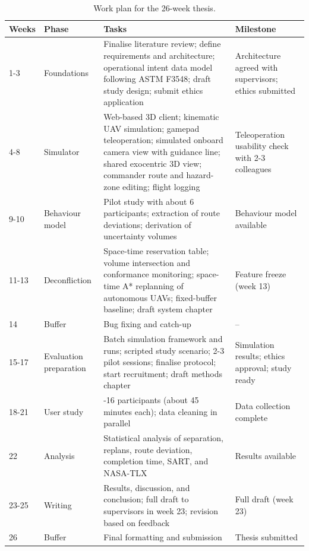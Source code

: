 \documentclass{article}
\begin{document}
\begin{table}[h]
\centering
\small
\renewcommand{\arraystretch}{1.3}
\begin{tabularx}{\textwidth}{@{}l>{\raggedright\arraybackslash}p{2.3cm}>{\raggedright\arraybackslash}X>{\raggedright\arraybackslash}p{3.2cm}@{}}
\toprule
\textbf{Weeks} & \textbf{Phase} & \textbf{Tasks} & \textbf{Milestone} \\
\midrule
1-3 & Foundations & Finalise literature review; define requirements and architecture; operational intent data model following ASTM F3548; draft study design; submit ethics application & Architecture agreed with supervisors; ethics submitted \\
4-8 & Simulator & Web-based 3D client; kinematic UAV simulation; gamepad teleoperation; simulated onboard camera view with guidance line; shared exocentric 3D view; commander route and hazard-zone editing; flight logging & Teleoperation usability check with 2-3 colleagues \\
9-10 & Behaviour model & Pilot study with about 6 participants; extraction of route deviations; derivation of uncertainty volumes & Behaviour model available \\
11-13 & Deconfliction & Space-time reservation table; volume intersection and conformance monitoring; space-time A* replanning of autonomous UAVs; fixed-buffer baseline; draft system chapter & Feature freeze (week 13) \\
14 & Buffer & Bug fixing and catch-up & -- \\
15-17 & Evaluation preparation & Batch simulation framework and runs; scripted study scenario; 2-3 pilot sessions; finalise protocol; start recruitment; draft methods chapter & Simulation results; ethics approval; study ready \\
18-21 & User study & 12-16 participants (about 45 minutes each); data cleaning in parallel & Data collection complete \\
22 & Analysis & Statistical analysis of separation, replans, route deviation, completion time, SART, and NASA-TLX & Results available \\
23-25 & Writing & Results, discussion, and conclusion; full draft to supervisors in week 23; revision based on feedback & Full draft (week 23) \\
26 & Buffer & Final formatting and submission & Thesis submitted \\
\bottomrule
\end{tabularx}
\caption{Work plan for the 26-week thesis.}
\label{tab:workplan}
\end{table}
\end{document}
